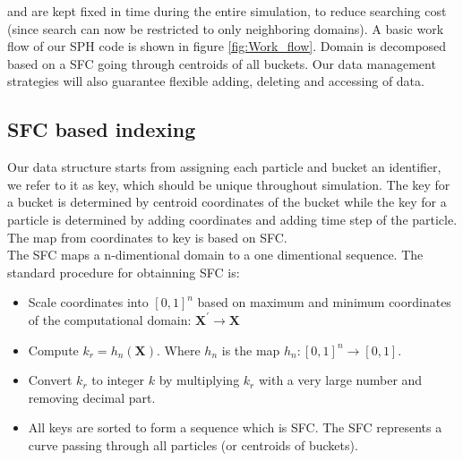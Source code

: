 \documentclass[conference,compsoc]{IEEEtran}
\begin{document}
and are kept fixed in time during the entire simulation, to reduce searching cost (since search can now be restricted to only neighboring domains). A basic work flow of our SPH code is shown in figure \ref{fig:Work_flow}.
Domain is decomposed based on a SFC going through centroids of all buckets. Our data management strategies will also guarantee flexible adding, deleting and accessing of data.
\subsection{SFC based indexing}
Our data structure starts from assigning each particle and bucket an identifier, we refer to it as key, which should be unique throughout simulation. The key for a bucket is determined by centroid coordinates of the bucket while the key for a particle is determined by adding coordinates and adding time step of the particle. The map from coordinates to key is based on SFC.\\
The SFC \cite{sagan2012space} maps a n-dimentional domain to a one dimentional sequence. The standard procedure for obtainning SFC is: 
\begin{itemize}
\item Scale coordinates into $[0,1]^n $ based on maximum and minimum coordinates of the computational domain: $\textbf{X}^\prime \rightarrow \textbf{X}$
\item Compute $k_r = h_n(\textbf{X})$. Where $h_n$ is the map $h_n: [0,1]^n \rightarrow [0,1]$. 
\item Convert $k_r$ to integer $k$ by multiplying $k_r$ with a very large number and removing decimal part.
\item All keys are sorted to form a sequence which is SFC. The SFC represents a curve passing through all particles (or centroids of buckets).
\end{itemize}
\end{document}
